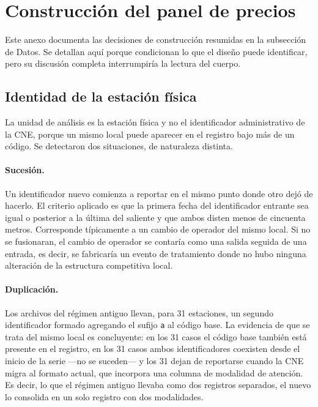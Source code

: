 \section{Construcción del panel de precios}
\label{anexo:datos}

Este anexo documenta las decisiones de construcción resumidas en la subsección
de Datos. Se detallan aquí porque condicionan lo que el diseño puede
identificar, pero su discusión completa interrumpiría la lectura del cuerpo.

\subsection{Identidad de la estación física}

La unidad de análisis es la estación física y no el identificador
administrativo de la CNE, porque un mismo local puede aparecer en el registro
bajo más de un código. Se detectaron dos situaciones, de naturaleza distinta.

\paragraph{Sucesión.} Un identificador nuevo comienza a reportar en el mismo
punto donde otro dejó de hacerlo. El criterio aplicado es que la primera fecha
del identificador entrante sea igual o posterior a la última del saliente y que
ambos disten menos de cincuenta metros. Corresponde típicamente a un cambio de
operador del mismo local. Si no se fusionaran, el cambio de operador se
contaría como una salida seguida de una entrada, es decir, se fabricaría un
evento de tratamiento donde no hubo ninguna alteración de la estructura
competitiva local.

\paragraph{Duplicación.} Los archivos del régimen antiguo llevan, para 31
estaciones, un segundo identificador formado agregando el sufijo \texttt{a} al
código base. La evidencia de que se trata del mismo local es concluyente: en
los 31 casos el código base también está presente en el registro, en los 31
casos ambos identificadores coexisten desde el inicio de la serie —no se
suceden— y los 31 dejan de reportarse cuando la CNE migra al formato actual,
que incorpora una columna de modalidad de atención. Es decir, lo que el régimen
antiguo llevaba como dos registros separados, el nuevo lo consolida en un solo
registro con dos modalidades.

